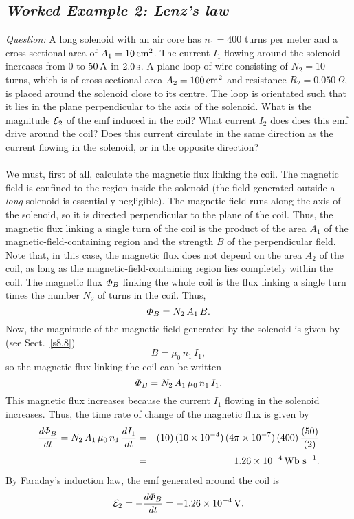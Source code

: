 \subsection*{\em Worked Example 2: Lenz's law}
{\em Question:} A long solenoid with an air core has $n_1=400$ turns per meter
and a cross-sectional area of $A_1= 10\,{\rm cm}^2$. The current $I_1$ flowing 
around
the solenoid increases from 0 to $50\,{\rm A}$ in $2.0\,{\rm s}$. 
A plane loop of wire consisting of $N_2=10$ turns, which is of cross-sectional area
$A_2= 100\,{\rm cm}^2$ and resistance $R_2=0.050\,\Omega$, is placed around the
solenoid close to its centre. The loop is orientated such that
it lies in the plane perpendicular to the axis
of the solenoid. 
What is the magnitude ${\cal E}_2$ of the emf 
induced 
in the coil? What current $I_2$ does does this emf drive around the coil? 
Does this current circulate in the same direction as the current flowing in
the solenoid, or in the opposite direction?\\
~\\
 We must, first of all, calculate the magnetic
flux linking the coil. The magnetic field is confined to the region
inside the solenoid (the field generated outside a {\em long}\/ solenoid
is essentially negligible). The magnetic field runs along the axis of the
solenoid, so it is directed perpendicular to the plane of the coil. Thus,
the magnetic flux linking a single turn of the coil is the product of the
area $A_1$ of the magnetic-field-containing region and the strength $B$
of the perpendicular field. Note that, in this case, the magnetic flux does
not depend on the area $A_2$ of the coil, as long as the magnetic-field-containing
region lies completely within the coil. 
 The magnetic flux ${\mit\Phi}_B$ linking the
whole coil is the flux linking a single turn times the number $N_2$ of
turns in the coil. Thus,
$$
{\mit\Phi}_B = N_2\,A_1\,B.
$$
Now, the magnitude of the magnetic field generated by the solenoid
is given by (see Sect.~\ref{s8.8}) 
$$
B = \mu_0\,n_1\,I_1,
$$
so the magnetic flux linking the coil can be written
$$
{\mit\Phi}_B = N_2\,A_1\,\mu_0\,n_1\,I_1.
$$
This magnetic flux increases because the current $I_1$ flowing in the
solenoid increases.
Thus, the time rate of change of the magnetic flux is given by
\begin{eqnarray}
\frac{d{\mit\Phi}_B}{dt} = 
 N_2\,A_1\,\mu_0\,n_1\,\frac{dI_1}{dt}
&=& (10)\,(10\times10^{-4})\,(4\pi\times 10^{-7}) \,(400)\,\frac{(50)}{(2)}
\nonumber\\[0.5ex]& =& 
1.26\times 10^{-4}\,{\rm Wb\,\,s}^{-1}.\nonumber
\end{eqnarray}
By Faraday's induction law, the emf generated around the coil is
$$
{\cal E}_2 = -\frac{ d{\mit\Phi}_B}{dt} =
 -1.26\times 10^{-4}\,{\rm V}.
$$

